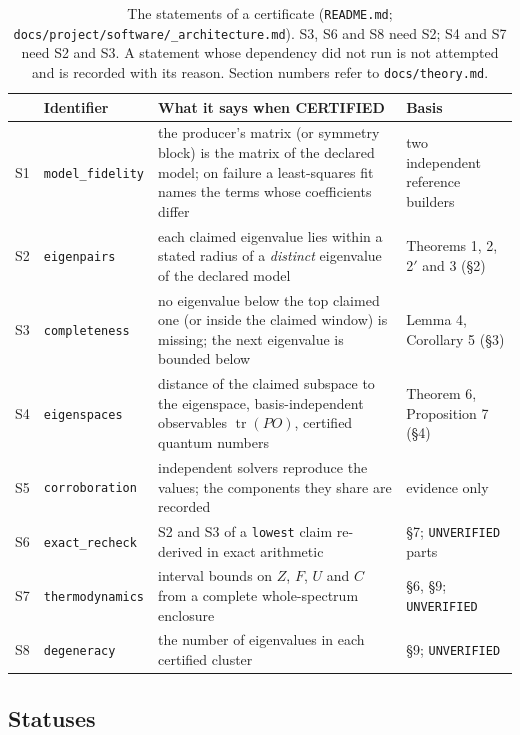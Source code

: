 \documentclass[11pt,a4paper]{article}
\newcommand{\code}[1]{\texttt{#1}}
\newcommand{\status}[1]{\textsf{#1}}
\newcommand{\CERT}{\status{CERTIFIED}}
\newcommand{\tr}{\operatorname{tr}}
\begin{document}
\begin{table}[ht]
\centering\small
\caption{The statements of a certificate (\code{README.md};
\code{docs/\allowbreak project/\allowbreak software/\allowbreak 01\_architecture.md}). S3, S6
and S8 need S2; S4 and S7 need S2 and S3. A statement whose dependency did not run is not attempted and is recorded
with its reason. Section numbers refer to \code{docs/theory.md}.}
\label{tab:statements}
\begin{tabular}{@{}p{0.7cm}p{2.7cm}p{7.4cm}p{3.6cm}@{}}
\toprule
& Identifier & What it says when \CERT & Basis \\
\midrule
S1 & \code{model\_fidelity} & the producer's matrix (or symmetry block) is the matrix of the declared model; on failure
a least-squares fit names the terms whose coefficients differ & two independent reference builders \\
S2 & \code{eigenpairs} & each claimed eigenvalue lies within a stated radius of a \emph{distinct} eigenvalue of the
declared model & Theorems 1, 2, 2$'$ and 3 (\S2) \\
S3 & \code{completeness} & no eigenvalue below the top claimed one (or inside the claimed window) is missing; the next
eigenvalue is bounded below & Lemma 4, Corollary 5 (\S3) \\
S4 & \code{eigenspaces} & distance of the claimed subspace to the eigenspace, basis-independent observables
$\tr(PO)$, certified quantum numbers & Theorem 6, Proposition 7 (\S4) \\
S5 & \code{corroboration} & independent solvers reproduce the values; the components they share are recorded &
evidence only \\
S6 & \code{exact\_recheck} & S2 and S3 of a \code{lowest} claim re-derived in exact arithmetic & \S7;
\code{UNVERIFIED} parts \\
S7 & \code{thermodynamics} & interval bounds on $Z$, $F$, $U$ and $C$ from a complete whole-spectrum enclosure & \S6,
\S9; \code{UNVERIFIED} \\
S8 & \code{degeneracy} & the number of eigenvalues in each certified cluster & \S9; \code{UNVERIFIED} \\
\bottomrule
\end{tabular}
\end{table}

\subsection{Statuses}
\end{document}
